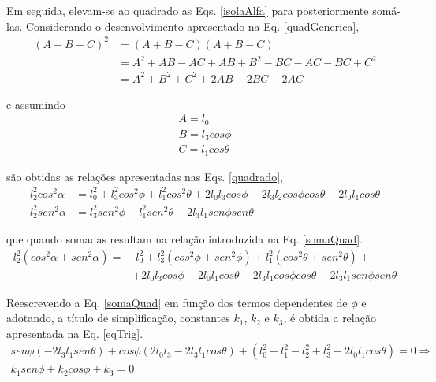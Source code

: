 \documentclass[12pt]{article}
\begin{document}
	Em seguida, elevam-se ao quadrado as Eqs. \ref{isolaAlfa} para posteriormente somá-las. Considerando o desenvolvimento apresentado na Eq. \ref{quadGenerica},
	\begin{equation}
		\label{quadGenerica}
		\begin{aligned}
			(A + B - C)^2 &= (A + B - C)(A + B - C) \\
			&= A^2 + AB - AC + AB + B^2 - BC - AC - BC + C^2  \\
			&= A^2 + B^2 + C^2 + 2AB - 2BC - 2AC
		\end{aligned}
	\end{equation}
	
	\noindent e assumindo
	\begin{equation}
		\begin{gathered}
			A = l_0 \\
			B = l_3 cos \phi \\
			C = l_1 cos \theta
		\end{gathered}
	\end{equation}

	\noindent são obtidas as relações apresentadas nas Eqs. \ref{quadrado},
	\begin{equation}
		\label{quadrado}
		\begin{aligned}
			l_2^2 cos^2 \alpha &= l_0^2 + l_3^2 cos^2 \phi + l_1^2 cos^2 \theta + 2 l_0 l_3 cos \phi - 2 l_3 l_2 cos \phi cos \theta - 2 l_0 l_1 cos \theta \\
			l_2^2 sen^2 \alpha &= l_3^2 sen^2 \phi + l_1^2 sen^2 \theta - 2 l_3 l_1 sen \phi sen \theta
		\end{aligned}
	\end{equation}
	
	\noindent que quando somadas resultam na relação introduzida na Eq. \ref{somaQuad}.
	\begin{equation}
		\label{somaQuad}
		\begin{aligned}
			l_2^2 (cos^2 \alpha + sen^2 \alpha) = & \;l_0^2 + l_3^2 (cos^2 \phi + sen^2 \phi) + l_1^2 (cos^2 \theta + sen^2 \theta) + \\
			&+2 l_0 l_3 cos \phi - 2 l_0 l_1 cos \theta - 2 l_3 l_1 cos \phi cos \theta - 2 l_3 l_1 sen \phi sen \theta
		\end{aligned}
	\end{equation}

	Reescrevendo a Eq. \ref{somaQuad} em função dos termos dependentes de $ \phi $ e adotando, a título de simplificação, constantes $ k_1 $, $ k_2 $ e $ k_3 $, é obtida a relação apresentada na Eq. \ref{eqTrig}. 
	\begin{gather}
		sen \phi (-2 l_3 l_1 sen \theta) + cos \phi (2 l_0 l_3 - 2 l_3 l_1 cos \theta) + (l_0^2 + l_1^2 - l_2^2 + l_3^2 - 2 l_0 l_1 cos \theta) = 0 \Rightarrow \nonumber \\
		k_1 sen \phi + k_2 cos \phi + k_3 = 0 \label{eqTrig}
	\end{gather}
	
\end{document}
